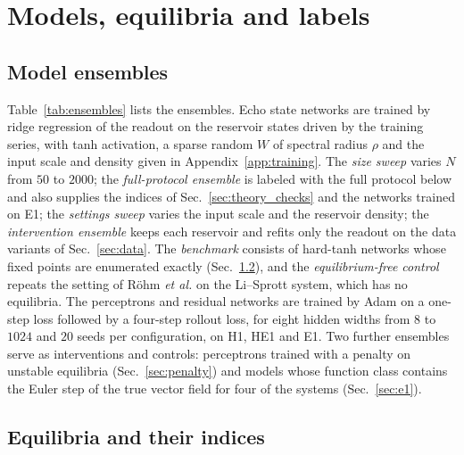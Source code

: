 \section{Models, equilibria and labels}
\label{sec:methods}

\subsection{Model ensembles}
\label{sec:ensembles}



Table~\ref{tab:ensembles} lists the ensembles. Echo state networks are trained by ridge regression of the readout on the
reservoir states driven by the training series,\cite{LukoseviciusJaeger2009Reservoir} with tanh activation, a sparse random
$W$ of spectral radius $\rho$ and the input scale and density given in Appendix~\ref{app:training}. The \emph{size sweep}
varies $N$ from $50$ to $2000$; the \emph{full-protocol ensemble} is labeled with the full protocol below and also supplies
the indices of Sec.~\ref{sec:theory_checks} and the networks trained on E1; the \emph{settings sweep} varies the input scale
and the reservoir density; the \emph{intervention ensemble} keeps each reservoir and refits only the readout on the data
variants of Sec.~\ref{sec:data}. The \emph{benchmark} consists of hard-tanh networks whose fixed points are enumerated
exactly (Sec.~\ref{sec:equilibria}), and the \emph{equilibrium-free control} repeats the setting of R\"ohm
\textit{et al.}\cite{Rohm2021} on the Li--Sprott system, which has no equilibria. The perceptrons and residual networks
are trained by Adam on a one-step loss followed by a four-step rollout loss, for eight hidden widths from $8$ to $1024$ and
$20$ seeds per configuration, on H1, HE1 and E1. Two further ensembles serve as interventions and controls: perceptrons
trained with a penalty on unstable equilibria (Sec.~\ref{sec:penalty}) and models whose function class contains the Euler
step of the true vector field for four of the systems (Sec.~\ref{sec:e1}).

\subsection{Equilibria and their indices}
\label{sec:equilibria}


